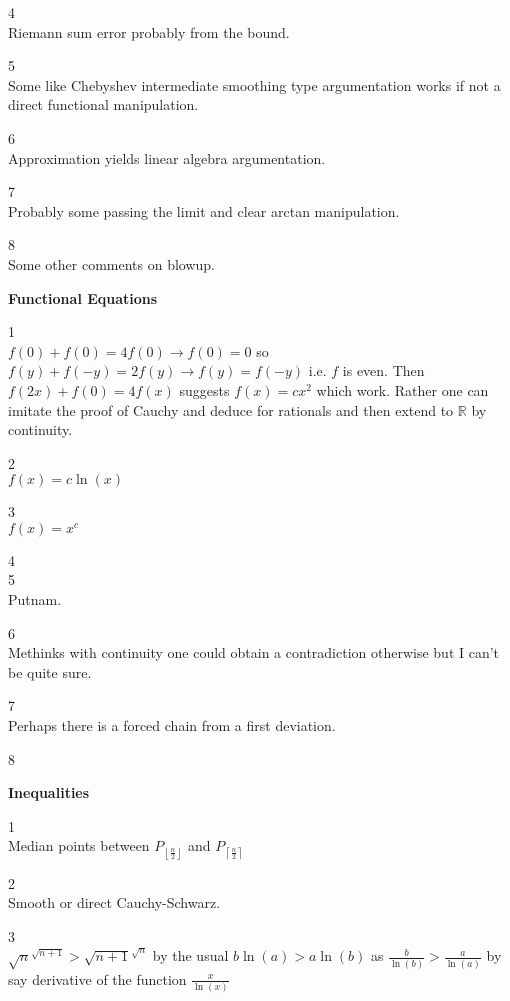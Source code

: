 4 \\
Riemann sum error probably from the bound.

5 \\
Some like Chebyshev intermediate smoothing type argumentation works if not a direct functional manipulation.

6 \\
Approximation yields linear algebra argumentation.

7 \\
Probably some passing the limit and clear arctan manipulation.

8 \\
Some other comments on blowup.

\newpage

\textbf{Functional Equations}

1 \\
$f(0)+f(0)=4f(0) \to f(0)=0$ so $f(y)+f(-y)=2f(y) \to f(y)=f(-y)$ i.e. $f$ is even. Then $f(2x)+f(0)=4f(x)$ suggests $f(x)=cx^2$ which work. Rather one can imitate the proof of Cauchy and deduce for rationals and then extend to $\mathbb{R}$ by continuity.

2 \\
$\boxed{f(x)=c\ln(x)}$

3 \\
$\boxed{f(x)=x^c}$

4 \\


5 \\
Putnam.

6 \\
Methinks with continuity one could obtain a contradiction otherwise but I can't be quite sure.

7 \\
Perhaps there is a forced chain from a first deviation.

8 \\


\newpage

\textbf{Inequalities}

1 \\
Median points between $P_{\left \lfloor \frac{n}{2} \right \rfloor}$ and $P_{\left \lceil \frac{n}{2} \right \rceil}$

2 \\
Smooth or direct Cauchy-Schwarz.

3 \\
$\sqrt{n}^{\sqrt{n+1}} > \sqrt{n+1}^{\sqrt{n}}$ by the usual $b\ln (a)>a\ln (b)$ as $\frac{b}{\ln(b)} > \frac{a}{\ln(a)}$ by say derivative of the function $\frac{x}{\ln(x)}$

